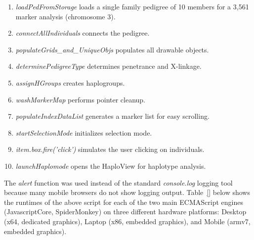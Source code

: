 \begin{spacing}{1.2}
\begin{enumerate}
\item{\textit{loadPedFromStorage} loads a single family pedigree of 10 members for a 3,561 marker analysis (chromosome 3).}
\item{\textit{connectAllIndividuals} connects the pedigree.}
\item{\textit{populateGrids\_and\_UniqueObjs} populates all drawable objects.}
\item{\textit{determinePedigreeType} determines penetrance and X-linkage.}
\item{\textit{assignHGroups} creates haplogroups.}
\item{\textit{washMarkerMap} performs pointer cleanup.}
\item{\textit{populateIndexDataList} generates a marker list for easy scrolling.}
\item{\textit{startSelectionMode} initializes selection mode.}
\item{\textit{item.box.fire('click')} simulates the user clicking on individuals.}
\item{\textit{launchHaplomode} opens the HaploView for haplotype analysis.}
\end{enumerate}
\end{spacing}

The \textit{alert} function was used instead of the standard \textit{console.log} logging tool because many mobile browsers do not show logging output. Table~\ref{} below shows the runtimes of the above script for each of the two main ECMAScript engines (JavascriptCore, SpiderMonkey) on three different hardware platforms: Desktop (x64, dedicated graphics), Laptop (x86, embedded graphics), and Mobile (armv7, embedded graphics).











